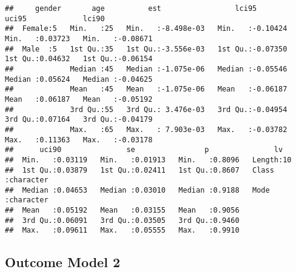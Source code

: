 \documentclass[
]{article}
\begin{document}
\begin{verbatim}
##     gender       age          est                 lci95              uci95             lci90         
##  Female:5   Min.   :25   Min.   :-8.498e-03   Min.   :-0.10424   Min.   :0.03723   Min.   :-0.08671  
##  Male  :5   1st Qu.:35   1st Qu.:-3.556e-03   1st Qu.:-0.07350   1st Qu.:0.04632   1st Qu.:-0.06154  
##             Median :45   Median :-1.075e-06   Median :-0.05546   Median :0.05624   Median :-0.04625  
##             Mean   :45   Mean   :-1.075e-06   Mean   :-0.06187   Mean   :0.06187   Mean   :-0.05192  
##             3rd Qu.:55   3rd Qu.: 3.476e-03   3rd Qu.:-0.04954   3rd Qu.:0.07164   3rd Qu.:-0.04179  
##             Max.   :65   Max.   : 7.903e-03   Max.   :-0.03782   Max.   :0.11363   Max.   :-0.03178  
##      uci90               se                p               lv           
##  Min.   :0.03119   Min.   :0.01913   Min.   :0.8096   Length:10         
##  1st Qu.:0.03879   1st Qu.:0.02411   1st Qu.:0.8607   Class :character  
##  Median :0.04653   Median :0.03010   Median :0.9188   Mode  :character  
##  Mean   :0.05192   Mean   :0.03155   Mean   :0.9056                     
##  3rd Qu.:0.06091   3rd Qu.:0.03505   3rd Qu.:0.9460                     
##  Max.   :0.09611   Max.   :0.05555   Max.   :0.9910
\end{verbatim}

\hypertarget{outcome-model-2-2}{%
\subsection{Outcome Model 2}\label{outcome-model-2-2}}
\end{document}
